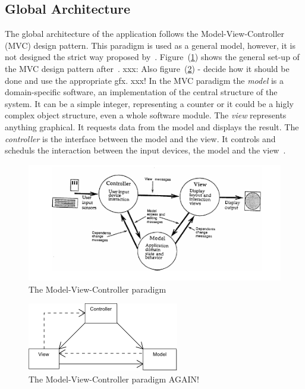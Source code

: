 \subsection{Global Architecture}
\label{sec:globalarchitecture}

The global architecture of the application follows the Model-View-Controller
(MVC) design pattern. This paradigm is used as a general model, however, 
it is not designed the strict way proposed by~.
Figure~(\ref{fig:modelviewcontroller}) shows the general set-up of the 
MVC design pattern after~. xxx: Also 
figure~(\ref{fig:modelviewcontroller2}) - decide how it should be done and use
the appropriate gfx. xxx!
In the MVC paradigm the \emph{model} is a domain-specific software, 
an implementation of the central structure of the system. It can be a simple
integer, representing a counter or it could be a higly complex object structure, 
even a whole software module. The \emph{view} represents anything graphical. 
It requests data from the model and displays the result. The \emph{controller} 
is the interface between the model and the view. It controls and scheduls the 
interaction between the input devices, the model and the 
view~.
\begin{figure}[htbp]
\begin{center}
\includegraphics[scale=0.5]{images/TechnicalDesign/MVC.png}
\caption{The Model-View-Controller paradigm}
\label{fig:modelviewcontroller}
\end{center}
\end{figure}

\begin{figure}[htbp]
\begin{center}
\includegraphics[scale=0.5]{images/TechnicalDesign/ModelViewControllerDiagram.png}
\caption{The Model-View-Controller paradigm AGAIN!}
\label{fig:modelviewcontroller2}
\end{center}
\end{figure}

